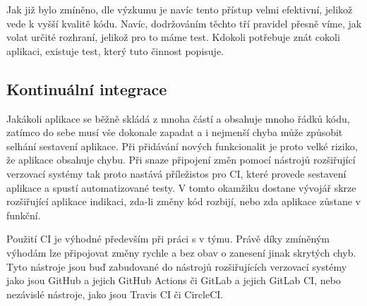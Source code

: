 Jak již bylo zmíněno,
dle výzkumu \cite{testing_quality} je navíc tento přístup velmi efektivní,
jelikož vede k vyšší kvalitě kódu.
Navíc,
dodržováním těchto tří pravidel přesně víme,
jak volat určité rozhraní,
jelikož pro to máme test.
Kdokoli potřebuje znát cokoli aplikaci,
existuje test,
který tuto činnost popisuje.
\cite{tdd}

\subsection{Kontinuální integrace}
\label{chap:ci}

Jakákoli aplikace se běžně skládá z mnoha částí
a obsahuje mnoho řádků kódu,
zatímco do sebe musí vše dokonale zapadat
a i nejmenší chyba může způsobit selhání sestavení aplikace.
Při přidávání nových funkcionalit je proto velké riziko,
že aplikace obsahuje chybu.
Při snaze připojení změn pomocí nástrojů rozšiřující verzovací systémy
tak proto nastává příležistos pro CI,
které provede sestavení aplikace a spustí automatizované testy.
V tomto okamžiku dostane vývojář skrze rozšiřující aplikace indikaci,
zda-li změny kód rozbijí,
nebo zda aplikace zůstane v funkční.
\cite{ci}

Použití CI je výhodné především při práci s v týmu.
Právě díky zmíněným výhodám lze připojovat změny rychle a bez obav o zanesení
jinak skrytých chyb.
Tyto nástroje jsou buď zabudované do nástrojů rozšiřujících verzovací systémy
jako jsou GitHub a jejich GitHub Actions či GitLab a jejich GitLab CI,
nebo nezávislé nástroje,
jako jsou Travis CI či CircleCI.
\cite{ci}
